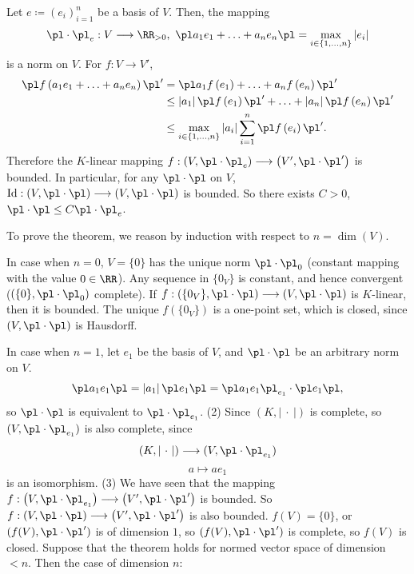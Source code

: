 \begin{proofenv}
    Let $e\coloneq \left(e_i\right)_{i=1}^n$ be a basis of $V$. Then, the mapping
    $$\pl\cdot\pl_e: V\longrightarrow \RR_{>0},\ \pl a_1e_1+\ldots+ a_ne_n\pl=\max_{i\in\{1,\ldots,n\}}\left|e_i\right|$$
    is a norm on $V$. For $f:V\longrightarrow V'$, 
    \begin{align}
        \pl f\left(a_1e_1+\ldots+a_ne_n\right)\pl'&=\pl a_1 f\left(e_1\right)+\ldots+ a_nf\left(e_n\right)\pl'\\
        &\le\left|a_1\right|\pl f\left(e_1\right)\pl' +\ldots+\left|a_n\right|\pl f\left(e_n\right)\pl'\\
        &\le \max_{i\in\{1,\ldots,n\}}\left|a_i\right|\sum_{i=1}^{n}\pl f\left(e_i\right)\pl'.
    \end{align}
    Therefore the $K$-linear mapping $f:\left(V,\pl\cdot\pl_e\right)\longrightarrow \left(V',\pl\cdot\pl'\right)$ is bounded. In particular, for any $\pl\cdot\pl$ on $V$, 
    $\mathrm{Id}: \left(V,\pl\cdot\pl\right)\longrightarrow \left(V,\pl\cdot\pl\right)$ is bounded. So there exists $C>0$, $\pl\cdot\pl\le C\pl\cdot\pl_e$.

    \quad To prove the theorem, we reason by induction with respect to $n=\dim\left(V\right)$. 
    
    \quad In case when $n=0$, $V=\{0\}$ has the unique norm $\pl\cdot\pl_0$ (constant mapping with the value $0\in \RR$). Any sequence in $\{0_V\}$ is constant, and hence convergent ($\left(\{0\},\pl\cdot\pl_0\right)$ complete). If $f:\left(\{0_V\},\pl\cdot\pl\right)\longrightarrow \left(V,\pl\cdot\pl\right)$ is $K$-linear, then it is bounded. The unique $f\left(\{0_V\}\right)$ is a one-point set, which is closed, since $\left(V,\pl\cdot\pl\right)$ is Hausdorff. 

    \quad In case when $n=1$, let $e_1$ be the basis of $V$, and $\pl\cdot\pl$ be an arbitrary norm on $V$.
    $$\pl a_1e_1\pl =\left|a_1\right|\pl e_1\pl=\pl a_1e_1\pl_{e_1}\cdot\pl e_1\pl, $$
    so $\pl\cdot\pl$ is equivalent to $\pl\cdot\pl_{e_1}$.
    \newline
    (2) Since $(K,\left|\ \cdot\ \right|)$ is complete, so $(V,\pl\cdot\pl_{e_1})$ is also complete, since 
    $$(K,\left|\ \cdot\ \right|)\longrightarrow (V,\pl\cdot\pl_{e_1})$$
    $$a\longmapsto ae_1$$
    is an isomorphism.
    \newline
    (3) We have seen that the mapping $f:\left(V,\pl\cdot\pl_{e_1}\right)\longrightarrow \left(V',\pl\cdot\pl'\right)$ is bounded. So $f:\left(V,\pl\cdot\pl\right)\longrightarrow \left(V',\pl\cdot\pl'\right)$ is also bounded. $f(V)=\{0\}$, or $(f(V),\pl\cdot\pl')$ is of dimension $1$, so $(f(V),\pl\cdot\pl')$ is complete, so $f(V)$ is closed.
    \newline
    Suppose that the theorem holds for normed vector space of dimension $<n$. Then the case of dimension $n$:


\end{proofenv}
